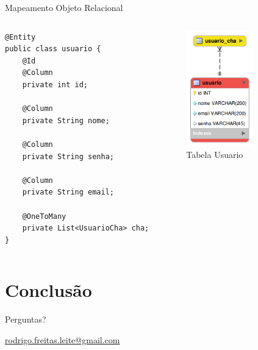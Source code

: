\documentclass[xcolor=dvipsnames]{beamer}
\begin{document}
\begin{frame}[fragile]{Mapeamento Objeto Relacional}
	\begin{columns}[c]
			\begin{lstlisting}[style=Java]
@Entity
public class usuario {
	@Id
	@Column
	private int id;

	@Column
	private String nome;

	@Column
	private String senha;
		
	@Column
	private String email;		
	
	@OneToMany
	private List<UsuarioCha> cha;
}
			\end{lstlisting}							
			\begin{figure}[!htb]
				\centering
				\includegraphics[keepaspectratio=true,height=5cm]{usuario-ER.png}
				\caption{Tabela Usuario}
				\label{usuario-ER}
			\end{figure}	
	\end{columns}
\end{frame}




\section{Conclusão}
	\begin{frame}{Perguntas?}
		\titlepage
		\begin{center}					
		 \href{mailto:rodrigo.freitas.leite@gmail.com}{rodrigo.freitas.leite@gmail.com}	
		\end{center}
			
	\end{frame}
\end{document}
